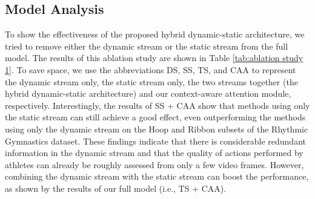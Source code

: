 \documentclass[sigconf]{acmart}
\begin{document}
\vspace{-0.1cm}




\subsection{Model Analysis}

\begin{table}[]
\vspace{0.2cm}
\caption{Ablation study showing the contribution of the context-aware attention module in our method.
}
\label{tab:ablation stduy 2}
\vspace{-0.7cm}
\end{table}




To show the effectiveness of the proposed hybrid dynamic-static architecture, we tried to remove either the dynamic stream or the static stream from the full model. The results of this ablation study are shown in Table \ref{tab:ablation study 1}. To save space, we use the abbreviations DS, SS, TS, and CAA to represent the dynamic stream only, the static stream only, the two streams together (the hybrid dynamic-static architecture) and our context-aware attention module, respectively. Interestingly, the results of SS + CAA show that methods using only the static stream can still achieve a good effect, even outperforming the methods using only the dynamic stream on the Hoop and Ribbon subsets of the Rhythmic Gymnastics dataset. These findings indicate that there is considerable redundant information in the dynamic stream and that the quality of actions performed by athletes can already be roughly assessed from only a few video frames. However, combining the dynamic stream with the static stream can boost the performance, as shown by the results of our full model (i.e., TS + CAA). 
\end{document}
